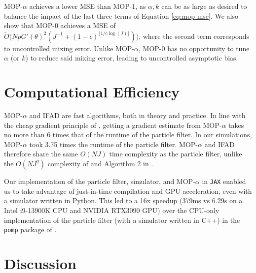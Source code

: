 \documentclass[9pt,twocolumn,pnasresearcharticle]{pnas-new}
\newcommand\arxiv[2]{#2} %
\begin{document}
MOP-$\alpha$ achieves a lower MSE than MOP-$1$, as $\alpha, k$ can be as large as desired to balance the impact of the last three terms of Equation \ref{eq:mop-mse}. We also show that MOP-$0$ achieves a MSE of $\tilde{O}\big(NpG'(\theta)^2(J^{-1}+(1-\epsilon)^{\lfloor1/c\log(J)\rfloor})\big)$, where the second term corresponds to uncontrolled mixing error. Unlike MOP-$\alpha$, MOP-$0$ has no opportunity to tune $\alpha$ (or $k$) to reduce said mixing error, leading to uncontrolled asymptotic bias. 


\arxiv{}{\vspace*{-2mm}}
\section{Computational Efficiency}

MOP-$\alpha$ and IFAD are fast algorithms, both in theory and practice. 
In line with the cheap gradient principle of \cite{kakade2019provably}, getting a gradient estimate from MOP-$\alpha$ takes no more than 6 times that of the runtime of the particle filter. In our simulations, MOP-$\alpha$ took 3.75 times the runtime of the particle filter. 
MOP-$\alpha$ and IFAD therefore share the same $O(NJ)$ time complexity as the particle filter, unlike the $O(NJ^2)$ complexity of \cite{corenflos21} and Algorithm 2 in \cite{poyiadjis11, scibior21}.



Our implementation of the particle filter, simulator, and MOP-$\alpha$ in \texttt{JAX} \cite{jax} enabled us to take advantage of just-in-time compilation and GPU acceleration, even with a simulator written in Python. This led to a 16x speedup (379ms vs 6.29s on a Intel i9-13900K CPU and NVIDIA RTX3090 GPU) over the CPU-only implementation of the particle filter (with a simulator written in C++) in the \texttt{pomp} package of \cite{king16}. 





\arxiv{}{\vspace*{-2mm}}
\section{Discussion}
\end{document}
